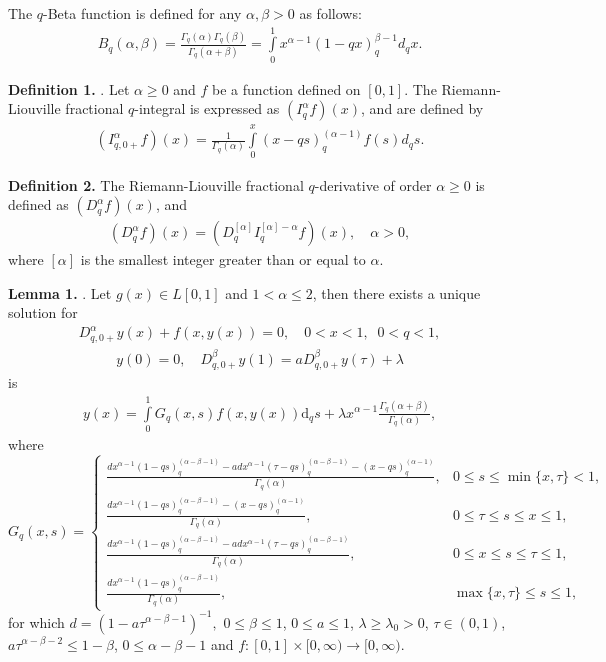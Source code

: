 \documentclass[12pt]{article}
\begin{document}
The \(q\)-Beta function is defined for any \(\alpha, \beta > 0\) as follows:
\begin{eqnarray*}
B_{q}(\alpha, \beta)=\frac{\Gamma_{q}(\alpha)\Gamma_q{(\beta)}}{\Gamma_q(\alpha+\beta)}=\int\limits_{0}^{1}x^{\alpha-1}(1-qx)^{\beta-1}_qd_qx.
\end{eqnarray*}

\textbf{Definition 1.} \cite{AM2012}.
Let \(\alpha \geq 0\) and \(f\) be a function defined on \([0,1]\). The Riemann-Liouville fractional \(q\)-integral is expressed as \(\left( I_{q}^{\alpha }f \right)\left( x \right)\), and are defined by
\begin{eqnarray*}
\left(I^\alpha_{q,0+}f\right)(x)=\frac{1}{\Gamma_q(\alpha)}\int\limits_0^x(x-qs)_q^{(\alpha-1)}f(s)d_qs.
\end{eqnarray*}


\textbf{Definition 2.}
The Riemann-Liouville fractional \(q\)-derivative of order \(\alpha \geq 0\) is defined as \(\left( D_{q}^{\alpha }f \right)\left( x \right)\), and
\begin{eqnarray*}
\left(D_q^\alpha f\right)(x)=\left(D_q^{[\alpha]} I_q^{[\alpha]-\alpha} f\right)(x), \quad \alpha>0,
\end{eqnarray*}
where $[\alpha]$ is the smallest integer greater than or equal to $\alpha$.

\textbf{Lemma 1.} \cite{YU2013}.
Let \( g(x) \in L[0,1] \) and \( 1 < \alpha \leq 2 \), then there exists a unique solution for
\begin{eqnarray}\label{additive2.9}
D_{q, 0+}^\alpha y(x)+f(x,y(x))=0, \quad 0<x<1,  \;\;0<q<1,
\end{eqnarray}
\begin{eqnarray}\label{additive2.10}
y(0)=0, \quad D_{q,0+}^\beta y(1)=a D_{q,0+}^\beta y(\tau)+\lambda
\end{eqnarray}
is
\begin{eqnarray*}
y(x)=\int\limits_0^1 G_q(x, s) f(x,y(x)) \mathrm{d}_q s+\lambda x^{\alpha-1}\frac{\Gamma_q(\alpha+\beta)}{\Gamma_q(\alpha)},
\end{eqnarray*}
where
\[
G_q(x, s) =
\begin{cases}
    \frac {d x^{\alpha - 1} (1 - qs)^{(\alpha - \beta - 1)}_q - a d x^{\alpha - 1}(\tau -qs)^{(\alpha - \beta - 1)}_q - (x - qs)^{(\alpha - 1)}_q}{\Gamma_q(\alpha)}, & 0 \leq s \leq \min\{x, \tau\} < 1, \\[5pt]
    \frac{d x^{\alpha - 1} (1 - qs)^{(\alpha - \beta - 1)}_q -(x - qs)^{(\alpha - 1)}_q}{\Gamma_q(\alpha)}, & 0 \leq \tau \leq s \leq x \leq 1, \\[5pt]
    \frac{d x^{\alpha - 1} (1 - qs)^{(\alpha - \beta - 1)}_q - a d x^{\alpha - 1} (\tau - qs)^{(\alpha - \beta - 1)}_q}{\Gamma_q(\alpha)}, & 0 \leq x \leq s \leq \tau \leq 1, \\[5pt]
    \frac{d x^{\alpha - 1} (1 - qs)^{(\alpha - \beta - 1)}_q}{\Gamma_q(\alpha)}, & \max\{x, \tau\} \leq s \leq 1,
\end{cases}
\]
for which
$
d = \left(1 - a \tau^{\alpha - \beta - 1}\right)^{-1},
$
$0 \leq \beta \leq 1$, $0 \leq a \leq 1$, $\lambda\geq\lambda_0>0$, $\tau \in (0,1)$, $a \tau^{\alpha-\beta-2} \leq 1-\beta$, $0 \leq \alpha-\beta-1$  and $f:[0,1] \times[0, \infty) \rightarrow[0, \infty).$
\end{document}
